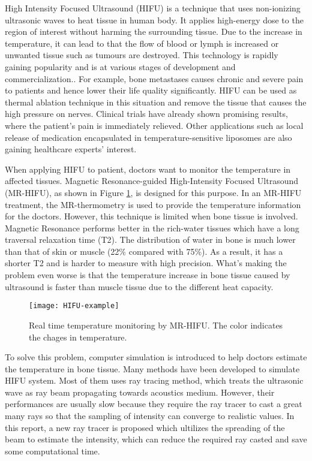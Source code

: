 
High Intensity Focused Ultrasound (HIFU) is a technique that uses non-ionizing ultrasonic waves to heat tissue in human body. It applies high-energy dose to the region of interest without harming the surrounding tissue\cite{JENNE2012311}. Due to the increase in temperature, it can lead to that the flow of blood or lymph is increased or unwanted tissue such as tumours are destroyed.  This technology is rapidly gaining popularity and is at various stages of development and commercialization.\cite{wp_HIFU}. For example, bone metastases causes chronic and severe pain to patients and hence lower their life quality significantly. HIFU can be used as thermal ablation technique in this situation and remove the tissue that causes the high pressure on nerves. Clinical trials have already shown promising results, where the patient's pain is immediately relieved\cite{vanwijk2013}. Other applications such as local release of medication encapsulated in temperature-sensitive liposomes are also gaining healthcare experts' interest.

When applying HIFU to patient, doctors want to monitor the temperature in affected tissues. Magnetic Resonance-guided High-Intensity Focused Ultrasound (MR-HIFU), as shown in Figure \ref{fig:HIFU_example}, is designed for this purpose. In an MR-HIFU treatment, the MR-thermometry is used to provide the temperature information for the doctors. However, this technique is limited when bone tissue is involved. Magnetic Resonance performs better in the rich-water tissues which have a long traversal relaxation time (T2)\cite{Modena_2018}. The distribution of water in bone is much lower than that of skin or muscle (22\% compared with 75\%). As a result, it has a shorter T2 and is harder to measure with high precision. What's making the problem even worse is that the temperature increase in bone tissue caused by ultrasound is faster than muscle tissue due to the different heat capacity.

\begin{figure}[h]
    \centering
    \texttt{[image: HIFU-example]}
    \caption{Real time temperature monitoring by MR-HIFU. The color indicates the chages in temperature. \cite{vanwijk2013}}
    \label{fig:HIFU_example}
\end{figure}

To solve this problem, computer simulation is introduced to help doctors estimate the temperature in bone tissue. Many methods have been developed to simulate HIFU system\cite{StochasticSim}. Most of them uses ray tracing method, which treats the ultrasonic wave as ray beam propagating towards acoustics medium. However, their performances are usually slow because they require the ray tracer to cast a great many rays so that the sampling of intensity can converge to realistic values. In this report, a new ray tracer is proposed which ultilizes the spreading of the beam to estimate the intensity, which can reduce the required ray casted and save some computational time.

